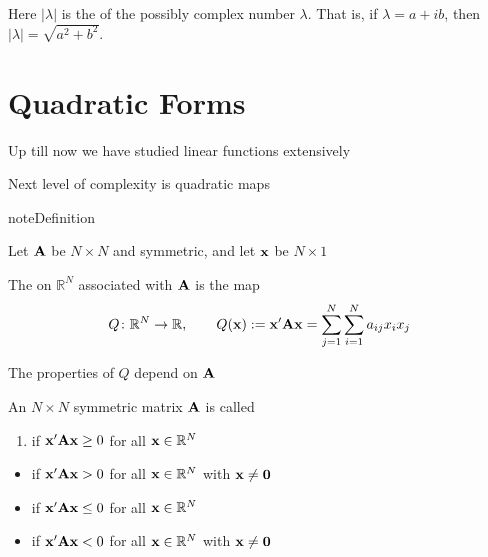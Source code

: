 \documentclass[letterpaper,10pt,english]{jupyterBook}
\begin{document}
\sphinxAtStartPar
Here \(|\lambda|\) is the  of the possibly complex number \(\lambda\).
That is, if \(\lambda = a + ib\), then \(|\lambda| = \sqrt{a^2 + b^2}\).




\section{Quadratic Forms}
\label{\detokenize{05.linear_algebra:quadratic-forms}}
\sphinxAtStartPar
Up till now we have studied linear functions extensively

\sphinxAtStartPar
Next level of complexity is quadratic maps

\begin{sphinxadmonition}{note}{Definition}

\sphinxAtStartPar
Let \({\bf A}\) be \(N \times N\) and symmetric, and let \({\bf x}\) be \(N \times 1\)

\sphinxAtStartPar
The  on \(\mathbb{R}^N\) associated with \({\bf A}\) is the map
\begin{equation*}
\begin{split}
%
Q \colon \mathbb{R}^N \to \mathbb{R}, \qquad
Q({\bf x}) := {\bf x}' {\bf A} {\bf x} = \sum_{j=1}^N \sum_{i=1}^N a_{ij} x_i x_j
%
\end{split}
\end{equation*}\end{sphinxadmonition}

\sphinxAtStartPar
The properties of \(Q\) depend on \({\bf A}\)

\sphinxAtStartPar
An \(N \times N\) symmetric matrix \({\bf A}\) is called
\begin{enumerate}
%
\item {} 
\sphinxAtStartPar
{} if \({\bf x}' {\bf A} {\bf x} \geq 0\)
for all \({\bf x} \in \mathbb{R}^N\)

\end{enumerate}
\begin{itemize}
\item {} 
\sphinxAtStartPar
{} if \({\bf x}' {\bf A} {\bf x} > 0\) for all \({\bf x}
\in \mathbb{R}^N\) with \({\bf x} \ne {\bf 0}\)

\item {} 
\sphinxAtStartPar
{} if \({\bf x}' {\bf A} {\bf x} \leq 0\)
for all \({\bf x} \in \mathbb{R}^N\)

\item {} 
\sphinxAtStartPar
{} if \({\bf x}' {\bf A} {\bf x} < 0\) for all \({\bf x}
\in \mathbb{R}^N\) with \({\bf x} \ne {\bf 0}\)

\end{itemize}
\end{document}
